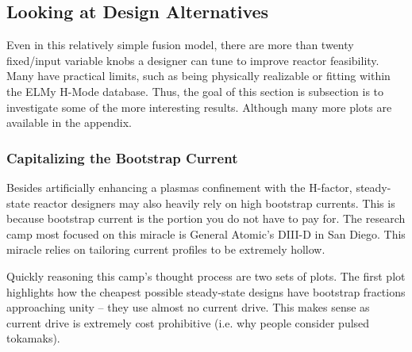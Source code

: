 \subsection{Looking at Design Alternatives}

Even in this relatively simple fusion model, there are more than twenty fixed/input variable knobs a designer can tune to improve reactor feasibility. Many have practical limits, such as being physically realizable or fitting within the ELMy H-Mode database. Thus, the goal of this section is subsection is to investigate some of the more interesting results. Although many more plots are available in the appendix.

\subsubsection{Capitalizing the Bootstrap Current}

Besides artificially enhancing a plasmas confinement with the H-factor, steady-state reactor designers may also heavily rely on high bootstrap currents. This is because bootstrap current is the portion you do not have to pay for. The research camp most focused on this miracle is General Atomic's DIII-D in San Diego. This miracle relies on tailoring current profiles to be extremely hollow.

Quickly reasoning this camp's thought process are two sets of plots. The first plot highlights how the cheapest possible steady-state designs have bootstrap fractions approaching unity -- they use almost no current drive. This makes sense as current drive is extremely cost prohibitive (i.e. why people consider pulsed tokamaks).

